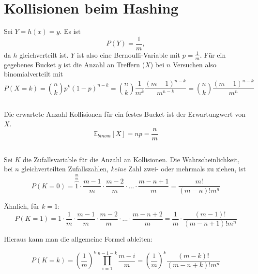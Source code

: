 \documentclass{article}
\begin{document}
\section{Kollisionen beim Hashing}
Sei $Y = h(x) = y$. Es ist
\begin{equation*}
   P(Y) = \frac{1}{m},
\end{equation*}
da $h$ gleichverteilt ist. $Y$ ist also eine Bernoulli-Variable mit
$p=\frac{1}{m}$. Für ein gegebenes Bucket $y$ ist die Anzahl an Treffern ($X$) bei $n$
Versuchen also binomialverteilt mit
\begin{equation*}
   P(X=k) = {n\choose k} p^k (1-p)^{n-k} = {n \choose k} \frac{1}{m^k}
   \frac{(m-1)^{n-k}}{m^{n-k}} = {n \choose k}\frac{(m-1)^{n-k}}{m^n}
\end{equation*}
\subsection{}
Die erwartete Anzahl Kollisionen für ein festes Bucket ist der Erwartungwert von
$X$.
\begin{equation*}
   \mathbb{E}_{binom}[X] = np = \frac{n}{m}
\end{equation*}
\subsection{}

Sei $K$ die Zufallsvariable für die Anzahl an Kollisionen. Die
Wahrscheinlichkeit, bei $n$ gleichverteilten Zufallszahlen, \emph{keine} Zahl
zwei- oder mehrmals zu ziehen, ist
\begin{equation*}
   P(K=0) = \overbrace{1}^{\frac{m}{m}} \cdot \frac{m-1}{m} \cdot \frac{m-2}{m}\cdot\ldots\cdot
   \frac{m-n+1}{m} = \frac{m!}{(m-n)!m^n}
\end{equation*}

Ähnlich, für $k=1$:
\begin{equation*}
   P(K=1) = 1 \cdot \frac{1}{m} \cdot \frac{m-1}{m} \cdot \frac{m-2}{m}\cdot\ldots\cdot
   \frac{m-n+2}{m} = \frac{1}{m}\cdot\frac{(m-1)!}{(m-n+1)!m^{n}}
\end{equation*}

Hieraus kann man die allgemeine Formel ableiten:

\begin{equation*}
   P(K=k) = \left(\frac{1}{m}\right)^{k}
   \prod\limits_{i=1}^{n-1-k}\frac{m-i}{m} =\left(\frac{1}{m}\right)^k \frac{(m-k)!}{(m-n+k)!m^{n}}
\end{equation*}
\end{document}
